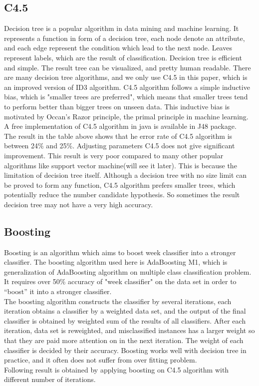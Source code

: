 \documentclass[a4paper,11pt]{article}
\begin{document}
\subsection{C4.5}
Decision tree is a popular algorithm in data mining and machine learning. It represents a function in form of a decision tree, each node denote an attribute, and each edge represent the condition which lead to the next node. Leaves represent labels, which are the result of classification. Decision tree is efficient and simple. The result tree can be visualized, and pretty human readable. There are many decision tree algorithms, and we only use C4.5 in this paper, which is an improved version of ID3 algorithm. C4.5 algorithm follows a simple inductive bias, which is "smaller trees are preferred", which means that smaller trees tend to perform better than bigger trees on unseen data. This inductive bias is motivated by Occan's Razor principle, the primal principle in machine learning. A free implementation of C4.5 algorithm in java is available in J48 package.\\
The result in the table above shows that he error rate of C4.5 algorithm is between 24\% and 25\%. Adjusting parameters C4.5 does not give significant improvement.
This result is very poor compared to many other popular algorithms like support vector machine(will see it later). This is because the limitation of decision tree itself. Although a decision tree with no size limit can be proved to form any function, C4.5 algorithm prefers smaller trees,
which potentially reduce the number candidate hypothesis. So sometimes the result decision tree may not have a very high accuracy.\\

\subsection{Boosting}
Boosting is an algorithm which aims to boost week classifier into a stronger classifier. The boosting algorithm used here is AdaBoosting M1, which is
generalization of AdaBoosting algorithm on multiple class classification problem. It requires over 50\% accuracy of "week classifier" on the data set
in order to ``boost'' it into a stronger classifier.\\
The boosting algorithm constructs the classifier by several iterations, each iteration obtains a classifier by a weighted data set, and the output of the final classifier is obtained by weighted sum of the results of all classifiers. After each iteration, data set is reweighted, and misclassified instances has a larger weight so that they are paid more attention on in the next iteration. The weight of each classifier is decided by their accuracy. Boosting works well with decision tree in practice, and it often does not suffer from over fitting problem.\\
Following result is obtained by applying boosting on C4.5 algorithm with different number of iterations.
\end{document}
